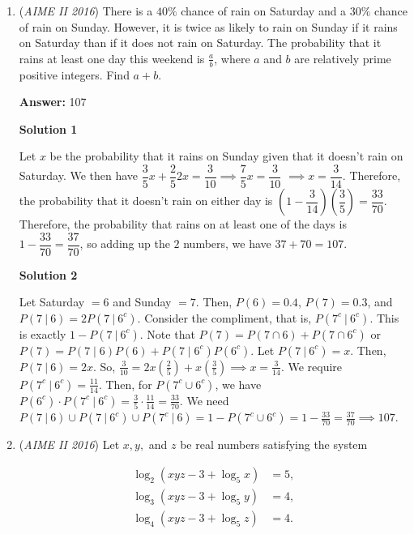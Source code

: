 \begin{enumerate}
 \textbf{vladimir.shelomovskii@gmail.com, vvsss}

 


	\item (\textit{AIME II 2016}) There is a $40\%$ chance of rain on Saturday and a $30\%$ chance of rain on Sunday. However, it is twice as likely to rain on Sunday if it rains on Saturday than if it does not rain on Saturday. The probability that it rains at least one day this weekend is $\frac{a}{b}$, where $a$ and $b$ are relatively prime positive integers. Find $a+b$.


 
 \textbf{Answer: }107



\textbf{Solution 1}

Let $x$ be the probability that it rains on Sunday given that it doesn't rain on Saturday. We then have $\dfrac{3}{5}x+\dfrac{2}{5}2x = \dfrac{3}{10} \implies \dfrac{7}{5}x=\dfrac{3}{10}$ $\implies x=\dfrac{3}{14}$. Therefore, the probability that it doesn't rain on either day is $\left(1-\dfrac{3}{14}\right)\left(\dfrac{3}{5}\right)=\dfrac{33}{70}$. Therefore, the probability that rains on at least one of the days is $1-\dfrac{33}{70}=\dfrac{37}{70}$, so adding up the $2$ numbers, we have $37+70=\boxed{107}$.

 



\textbf{Solution 2}

Let Saturday $=6$ and Sunday $=7$. Then, $P(6) = 0.4$, $P(7) = 0.3$, and $P(7 \ | \ 6) = 2P(7 \ | \ 6^c)$. Consider the compliment, that is, $P(7^c \ | \ 6^c)$. This is exactly $1 - P(7 \ | \ 6^c)$. Note that $P(7) = P(7 \cap 6) + P(7 \cap 6^c)$ or $P(7) = P(7 \mid 6)P(6) + P(7 \mid 6^c)P(6^c)$. Let $P(7 \ | \ 6^c) = x$. Then, $P(7 \ | \ 6) = 2x$. So, $\frac{3}{10} = 2x(\frac{2}{5}) + x(\frac{3}{5}) \implies x = \frac{3}{14}$. We require $P(7^c \ | \ 6^c) = \frac{11}{14}$. Then, for $P(7^c \cup 6^c)$, we have $P(6^c) \cdot P(7^c \ | \ 6^c) = \frac{3}{5} \cdot \frac{11}{14} = \frac{33}{70}$. We need $P(7 \ | \ 6) \cup P(7 \ | \ 6^c) \cup P(7^c \ | \ 6) = 1 - P(7^c \cup 6^c) = 1 - \frac{33}{70} = \frac{37}{70} \implies \boxed{107}$.

 


	\item (\textit{AIME II 2016}) Let $x,y,$ and $z$ be real numbers satisfying the system

 \begin{align*} \log_2(xyz-3+\log_5 x)&=5,\\ \log_3(xyz-3+\log_5 y)&=4,\\ \log_4(xyz-3+\log_5 z)&=4. \end{align*}


\end{enumerate}
